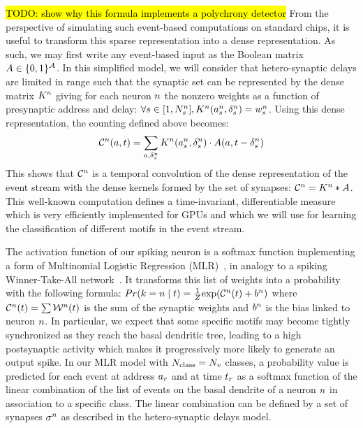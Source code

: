 \documentclass[default]{sn-jnl}%
\theoremstyle{thmstyleone}%
\theoremstyle{thmstyletwo}%
\theoremstyle{thmstylethree}%
\DeclareRobustCommand{\note}[1]{{\sethlcolor{yellow}\hl{#1}}}
\begin{document}
\note{ TODO: show why this formula implements a polychrony detector }
From the perspective of simulating such event-based computations on standard chips, it is useful to transform this sparse representation into a dense representation. As such, we may first write any event-based input as the Boolean matrix $A \in \{0, 1 \}^{\mathcal{A}}$. In this simplified model, we will consider that hetero-synaptic delays are limited in range such that the synaptic set can be represented by the dense matrix $K^n$ giving for each neuron $n$ the nonzero weights as a function of presynaptic address and delay: $\forall {s\in [1,N_{s}^n]}, K^n(a_s^n, \delta_s^n) = w_s^n$. 
Using this dense representation, the counting defined above becomes:
$$
\mathcal{C}^n(a,t)
= \sum_{a, \delta_s^n} K^n(a_s^n, \delta_s^n) \cdot A(a, t-\delta_s^n)
$$
%
This shows that $\mathcal{C}^n$ is a temporal convolution of the dense representation of the event stream with the dense kernels formed by the set of synapses:  $\mathcal{C}^n = K^n \ast A$. This well-known computation defines a time-invariant, differentiable measure which is very efficiently implemented for GPUs and which we will use for learning the classification of different motifs in the event stream.
%

The activation function of our spiking neuron is a softmax function implementing a form of  Multinomial Logistic Regression (MLR)~\citep{grimaldi_robust_2022}, in analogy to a spiking Winner-Take-All network~\citep{nessler_bayesian_2013}. 
It transforms this list of weights into a probability with the following formula:
$
Pr(k=n \; \vert \; t) =
\frac 1 Z
{\exp  (\mathcal{C}^n(t) +b^n) }
$ 
where $\mathcal{C}^n(t) = \sum
\mathcal{W}^n(t)
$ is the sum of the synaptic weights and $b^n$ is the bias linked to neuron $n$. 
In particular, we expect that some specific motifs may become tightly synchronized as they reach the basal dendritic tree, leading to a high postsynaptic activity which makes it progressively more likely to generate an output spike.
%
In our MLR model with $N_\text{class}=N_v$ classes, a probability value is predicted for each event at address $a_r$ and at time $t_r$ as a softmax function of the linear combination of the list of events on the basal dendrite of a neuron $n$ in association to a specific class. The linear combination can be defined by a set of synapses $\sigma^n$ as described in the hetero-synaptic delays model. 
%
\end{document}
